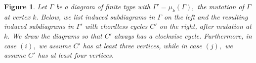 \documentclass[11pt]{amsart}
\newtheorem{lem}[thm]{Lemma}
\newtheorem{longfig}[thm]{Figure}
\theoremstyle{definition}
\begin{document}

\begin{longfig}
\label{fig:cycle_types}
Let $\Gamma$ be a diagram of finite type with $\Gamma' = \mu_k(\Gamma),$ the mutation of $\Gamma$ at vertex $k.$ Below, we list induced subdiagrams in $\Gamma$ on the left and the resulting induced subdiagrams in $\Gamma'$ with chordless cycles $C'$ on the right, after mutation at $k.$ We draw the diagrams so that $C'$ always has a clockwise cycle. Furthermore, in case $(i),$ we assume $C'$ has at least three vertices, while in case $(j),$ we assume $C'$ has at least four vertices. 


\end{longfig}
\end{document}
